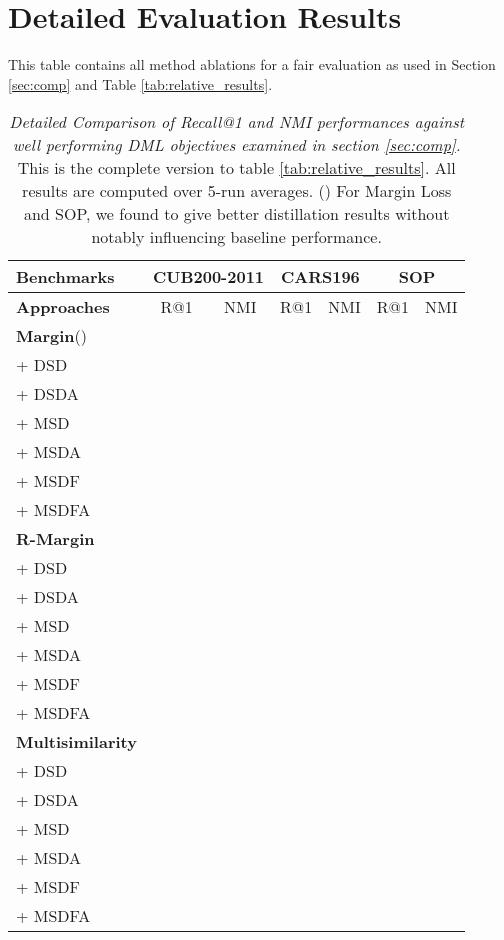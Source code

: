 \documentclass{article} \usepackage{arxiv_style,times}
\begin{document}
\newpage
\section{Detailed Evaluation Results}\label{supp:detailed_1}
This table contains all method ablations for a fair evaluation as used in Section \ref{sec:comp} and Table \ref{tab:relative_results}.
\begin{table}[h]
\caption{\textit{Detailed Comparison of Recall@1 and NMI performances against well performing DML objectives examined in section \ref{sec:comp}.} This is the complete version to table \ref{tab:relative_results}. All results are computed over 5-run averages. () For Margin Loss and SOP, we found  to give better distillation results without notably influencing baseline performance.}
 \footnotesize
   \setlength\tabcolsep{1.4pt}
   \centering
\begin{tabular}{l|c|c||c|c||c|c}
     \toprule
     \multicolumn{1}{l}{\textbf{Benchmarks}} & \multicolumn{2}{c}{\textsc{CUB200-2011}} & \multicolumn{2}{c}{\textsc{CARS196}} & \multicolumn{2}{c}{\textsc{SOP}} \\
     \midrule
     \textbf{Approaches}  & R@1 & NMI & R@1 & NMI & R@1 & NMI\\
    \midrule
    \textbf{Margin}() &  &  &  &  &  & \\        
    + DSD &  &  &  &  &  & \\
    + DSDA &  &  &  &  &  & \\
    + MSD &  &  &  &  &  & \\
    + MSDA &  &  &  &  &  & \\
    + MSDF &  &  &  &  &  & \\
    + MSDFA &  &  &  &  &  & \\
    
    \midrule
    \textbf{R-Margin} &  &  &  &  &  & \\ 
    + DSD &  &  &  &  &  & \\
    + DSDA &  &  &  &  &  & \\
    + MSD &  &  &  &  &  & \\
    + MSDA &  &  &  &  &  & \\
    + MSDF &  &  &  &  &  & \\
    + MSDFA &  &  &  &  &  & \\
    \midrule
    \textbf{Multisimilarity} &  &  &  &  &  & \\
    + DSD &  &  &  &  & & \\
    + DSDA &  &  &  &  &  & \\
    + MSD &  &  &  &  &  & \\
    + MSDA &  &  &  &  &  & \\
    + MSDF &  &  &  &  &  & \\
    + MSDFA &  &  &  &  &  & \\
         
\bottomrule
    \end{tabular}
    \label{tab:relative_results_long}
 \end{table}
\end{document}
